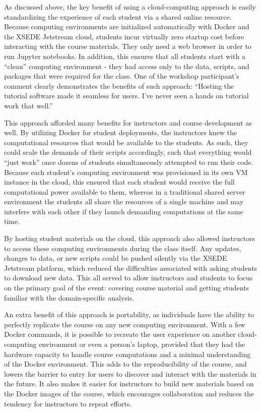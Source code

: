 As discussed above, the key benefit of using a cloud-computing approach is
easily standardizing the experience of each student via a shared online
resource. Because computing environments are initialized automatically with
Docker and the XSEDE Jetstream cloud, students incur virtually zero startup cost
before interacting with the course materials. They only need a web browser in
order to run Jupyter notebooks. In addition, this ensures that all students
start with a ``clean'' computing environment - they had access only to the data,
scripts, and packages that were required for the class. One of the workshop
participant's comment clearly demonstrates the benefits of such approach: ``Hosting
the tutorial software made it seamless for users. I've never seen a hands on
tutorial work that well.''

This approach afforded many benefits for instructors and course development as
well. By utilizing Docker for student deployments, the instructors knew the
computational resources that would be available to the students. As such, they
could scale the demands of their scripts accordingly, such that everything would
``just work'' once dozens of students simultaneously attempted to run their
code. Because each student's computing environment was provisioned in its own VM
instance in the cloud, this ensured that each student would receive the full
computational power available to them, whereas in a traditional shared server
environment the students all share the resources of a single machine and may
interfere with each other if they launch demanding computations at the same
time.

By hosting student materials on the cloud, this approach also allowed instructors
to access these computing environments during the class itself. Any updates,
changes to data, or new scripts could be pushed silently via the XSEDE Jetstream
platform, which reduced the difficulties associated with asking students to
download new data. This all served to allow instructors and students to focus on
the primary goal of the event: covering course material and getting students
familiar with the domain-specific analysis.

An extra benefit of this approach is portability, as individuals have the
ability to perfectly replicate the course on any new computing environment. With
a few Docker commands, it is possible to recreate the user experience on another
cloud-computing environment or even a person's laptop, provided that they had
the hardware capacity to handle course computations and a minimal understanding
of the Docker environment. This adds to the reproducibility of the course, and
lowers the barrier to entry for users to discover and interact with the
materials in the future. It also makes it easier for instructors to build new
materials based on the Docker images of the course, which encourages
collaboration and reduces the tendency for instructors to repeat efforts.

